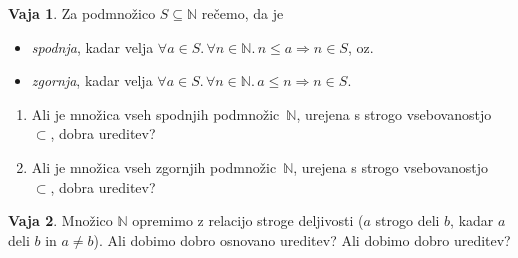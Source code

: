 \documentclass{article}
\newcommand{\all}[1]{\forall #1 .\,}
\newcommand{\lthen}{\Rightarrow}
\newcommand{\NN}{\mathbb{N}}
\theoremstyle{definition}
\newtheorem{vaja}{Vaja}
\begin{document}
\begin{vaja}
  Za podmnožico $S \subseteq \NN$ rečemo, da je
  \begin{itemize}
    \item
      \emph{spodnja}, kadar velja $\all{a \in S}\all{n \in \NN}{n \leq a \lthen n \in S}$, oz.
    \item
      \emph{zgornja}, kadar velja $\all{a \in S}\all{n \in \NN}{a \leq n \lthen n \in S}$.
  \end{itemize}
  \begin{enumerate}
    \item
      Ali je množica vseh spodnjih podmnožic~$\NN$, urejena s strogo vsebovanostjo~$\subset$, dobra ureditev?
    \item
      Ali je množica vseh zgornjih podmnožic~$\NN$, urejena s strogo vsebovanostjo~$\subset$, dobra ureditev?
  \end{enumerate}
\end{vaja}

\begin{vaja}
  Množico $\NN$ opremimo z relacijo stroge deljivosti ($a$ strogo deli $b$, kadar $a$ deli $b$ in $a \neq b$). Ali dobimo dobro osnovano ureditev? Ali dobimo dobro ureditev?
\end{vaja}
\end{document}
